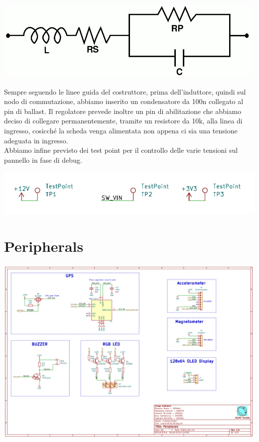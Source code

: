\begin{center}
\includegraphics[scale=0.6]{figures/image37.png}
\captionsetup{type=figure}
\end{center}

\noindent Sempre seguendo le linee guida del costruttore, prima dell’induttore, 
quindi sul nodo di commutazione, abbiamo inserito un condensatore da 100n collegato al pin di ballast.
Il regolatore prevede inoltre un pin di abilitazione che abbiamo deciso di collegare permanentemente, 
tramite un resistore da 10k, alla linea di ingresso, cosicché la scheda venga alimentata non appena ci 
sia una tensione adeguata in ingresso.\\
Abbiamo infine previsto dei test point per il controllo delle varie
tensioni sul pannello in fase di debug.

\begin{center}
\includegraphics[scale=0.95]{figures/image78.png}
\captionsetup{type=figure}
\end{center}

\hypertarget{peripherals}{%
\section{Peripherals}\label{peripherals}}

\begin{center}
\includegraphics[scale=0.5]{figures/image15.png}
\captionsetup{type=figure}
\end{center}

